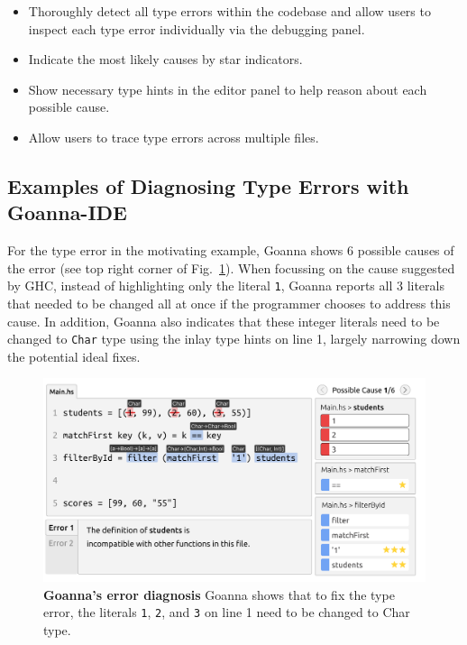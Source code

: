     \begin{itemize}
        \item Thoroughly detect all type errors within the codebase and allow users to inspect each type error individually via the debugging panel.
        \item Indicate the most likely causes by star indicators.
        \item Show necessary type hints in the editor panel to help reason about each possible cause.
        \item Allow users to trace type errors across multiple files.
    \end{itemize}

    \subsection{Examples of Diagnosing Type Errors with Goanna-IDE}

    For the type error in the motivating example, Goanna shows 6 possible causes of the error (see top right corner of Fig.~\ref{fig:goanna-example-1}). When focussing on the cause suggested by GHC, instead of highlighting only the literal \texttt{1}, Goanna reports all 3 literals that needed to be changed all at once if the programmer chooses to address this cause. In addition, Goanna also indicates that these integer literals need to be changed to \texttt{Char} type using the inlay type hints on line 1, largely narrowing down the potential ideal fixes. 
    

    \begin{figure}[htb!]
        \centering
        \includegraphics[width=\linewidth]{images/Goanna-Example-1}
        \caption{\textbf{Goanna's error diagnosis} Goanna shows that to fix the type error, the literals \texttt{1}, \texttt{2}, and \texttt{3} on line 1 need to be changed to Char type.}
        \label{fig:goanna-example-1}
    \end{figure}


